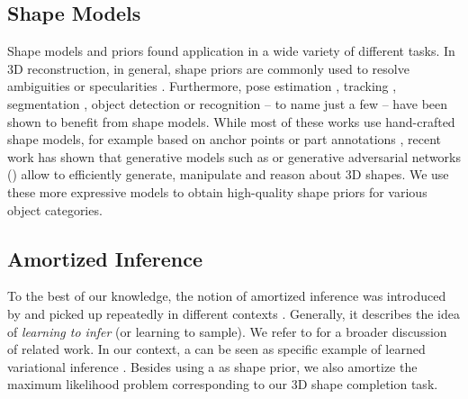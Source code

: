 \subsection{Shape Models}

Shape models and priors found application in a wide variety of different tasks. In 3D reconstruction, in general, shape priors are commonly used to resolve ambiguities or specularities \citep{Dame2013CVPR,Guney2015CVPR,Kar2015CVPR}. Furthermore, pose estimation \citep{Sandhu2011PAMI,Sandhu2009CVPR,Prisacariu2013ACCV,Aubry2014CVPR}, tracking \citep{Ma2014ECCV,Leotta2009CVPR}, segmentation \citep{Sandhu2011PAMI,Sandhu2009CVPR,Prisacariu2013ACCV}, object detection \citep{Zia2013PAMI,Zia2014CVPR,Pepik2015CVPR,Song2014ECCV,Zheng2015GCPR} or recognition \citep{Lin2014ECCV} -- to name just a few -- have been shown to benefit from shape models. While most of these works use hand-crafted shape models, for example based on anchor points or part annotations \citep{Zia2013PAMI,Zia2014CVPR,Pepik2015CVPR,Lin2014ECCV}, recent work \citep{Liu2017ARXIV,Sharma2016ARXIV,Girdhar2016ECCV,Wu2016NIPS,Wu2015CVPR,Smith2017ARXIV,Nash2017SGP,Liu2017ARXIV} has shown that generative models such as \VAEs \citep{Kingma2014ICLR} or generative adversarial networks (\GANs) \citep{Goodfellow2014NIPS} allow to efficiently generate, manipulate and reason about 3D shapes. We use these more expressive models to obtain high-quality shape priors for various object categories.

\subsection{Amortized Inference}

To the best of our knowledge, the notion of amortized inference was introduced by \cite{Gersham2014COGSCI} and picked up repeatedly in different contexts \citep{Rezende2015ICML,Wang2016ARXIV,Ritchie2016ARXIV}. Generally, it describes the idea of \emph{learning to infer} (or learning to sample). We refer to \citep{Wang2016ARXIV} for a broader discussion of related work. In our context, a \VAE can be seen as specific example of learned variational inference \citep{Kingma2014ICLR,Rezende2015ICML}. Besides using a \VAE as shape prior, we also amortize the maximum likelihood problem corresponding to our 3D shape completion task.